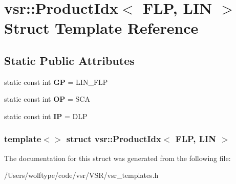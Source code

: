 \hypertarget{structvsr_1_1_product_idx_3_01_f_l_p_00_01_l_i_n_01_4}{\section{vsr\-:\-:Product\-Idx$<$ F\-L\-P, L\-I\-N $>$ Struct Template Reference}
\label{structvsr_1_1_product_idx_3_01_f_l_p_00_01_l_i_n_01_4}
}
\subsection*{Static Public Attributes}
\begin{DoxyCompactItemize}
\item 
\hypertarget{structvsr_1_1_product_idx_3_01_f_l_p_00_01_l_i_n_01_4_aedc4826a48483e5659d9dcdf96eaf434}{static const int {\bfseries G\-P} = L\-I\-N\-\_\-\-F\-L\-P}\label{structvsr_1_1_product_idx_3_01_f_l_p_00_01_l_i_n_01_4_aedc4826a48483e5659d9dcdf96eaf434}

\item 
\hypertarget{structvsr_1_1_product_idx_3_01_f_l_p_00_01_l_i_n_01_4_a9bab07690daaeac236ab38d507897357}{static const int {\bfseries O\-P} = S\-C\-A}\label{structvsr_1_1_product_idx_3_01_f_l_p_00_01_l_i_n_01_4_a9bab07690daaeac236ab38d507897357}

\item 
\hypertarget{structvsr_1_1_product_idx_3_01_f_l_p_00_01_l_i_n_01_4_a02aeb04f260817f980013fdfb1e5043f}{static const int {\bfseries I\-P} = D\-L\-P}\label{structvsr_1_1_product_idx_3_01_f_l_p_00_01_l_i_n_01_4_a02aeb04f260817f980013fdfb1e5043f}

\end{DoxyCompactItemize}
\subsubsection*{template$<$$>$ struct vsr\-::\-Product\-Idx$<$ F\-L\-P, L\-I\-N $>$}



The documentation for this struct was generated from the following file\-:\begin{DoxyCompactItemize}
\item 
/\-Users/wolftype/code/vsr/\-V\-S\-R/vsr\-\_\-templates.\-h\end{DoxyCompactItemize}
